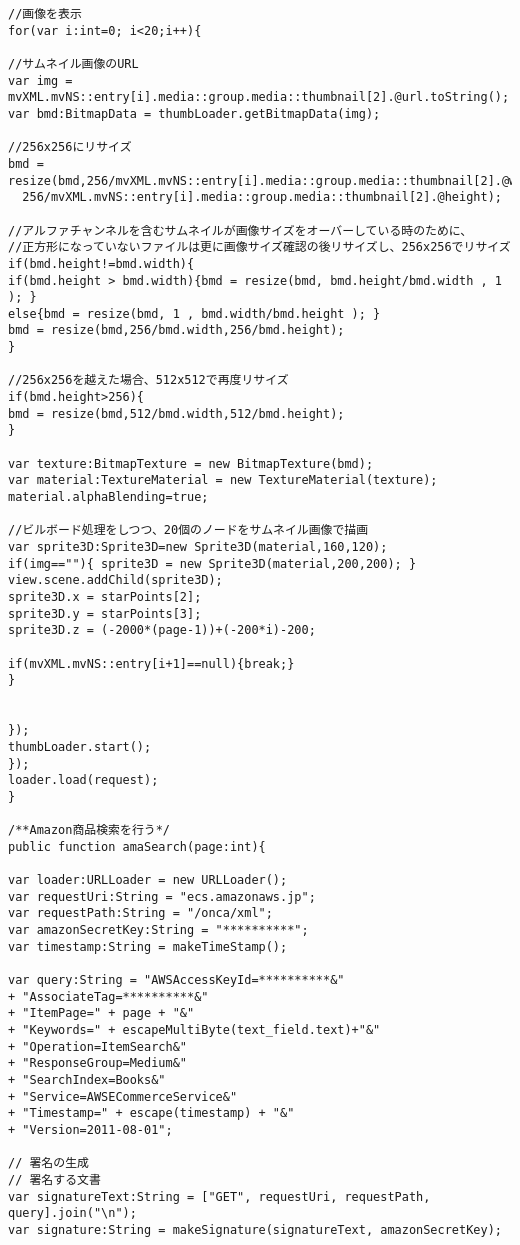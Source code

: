 {\begin{verbatim}
//画像を表示
for(var i:int=0; i<20;i++){

//サムネイル画像のURL
var img = mvXML.mvNS::entry[i].media::group.media::thumbnail[2].@url.toString();
var bmd:BitmapData = thumbLoader.getBitmapData(img);

//256x256にリサイズ
bmd = resize(bmd,256/mvXML.mvNS::entry[i].media::group.media::thumbnail[2].@width,
  256/mvXML.mvNS::entry[i].media::group.media::thumbnail[2].@height);

//アルファチャンネルを含むサムネイルが画像サイズをオーバーしている時のために、
//正方形になっていないファイルは更に画像サイズ確認の後リサイズし、256x256でリサイズ
if(bmd.height!=bmd.width){
if(bmd.height > bmd.width){bmd = resize(bmd, bmd.height/bmd.width , 1 ); }
else{bmd = resize(bmd, 1 , bmd.width/bmd.height ); }
bmd = resize(bmd,256/bmd.width,256/bmd.height);
}

//256x256を越えた場合、512x512で再度リサイズ
if(bmd.height>256){
bmd = resize(bmd,512/bmd.width,512/bmd.height);
}

var texture:BitmapTexture = new BitmapTexture(bmd);
var material:TextureMaterial = new TextureMaterial(texture);
material.alphaBlending=true;

//ビルボード処理をしつつ、20個のノードをサムネイル画像で描画
var sprite3D:Sprite3D=new Sprite3D(material,160,120);
if(img==""){ sprite3D = new Sprite3D(material,200,200); }
view.scene.addChild(sprite3D);
sprite3D.x = starPoints[2];
sprite3D.y = starPoints[3];
sprite3D.z = (-2000*(page-1))+(-200*i)-200;

if(mvXML.mvNS::entry[i+1]==null){break;}
}


});
thumbLoader.start();
});
loader.load(request);
}

/**Amazon商品検索を行う*/
public function amaSearch(page:int){

var loader:URLLoader = new URLLoader();
var requestUri:String = "ecs.amazonaws.jp";
var requestPath:String = "/onca/xml";
var amazonSecretKey:String = "**********";
var timestamp:String = makeTimeStamp();

var query:String = "AWSAccessKeyId=**********&"
+ "AssociateTag=**********&"
+ "ItemPage=" + page + "&"
+ "Keywords=" + escapeMultiByte(text_field.text)+"&"
+ "Operation=ItemSearch&"
+ "ResponseGroup=Medium&"
+ "SearchIndex=Books&"
+ "Service=AWSECommerceService&"
+ "Timestamp=" + escape(timestamp) + "&"
+ "Version=2011-08-01";

// 署名の生成
// 署名する文書
var signatureText:String = ["GET", requestUri, requestPath, query].join("\n");
var signature:String = makeSignature(signatureText, amazonSecretKey);


\end{verbatim}}
